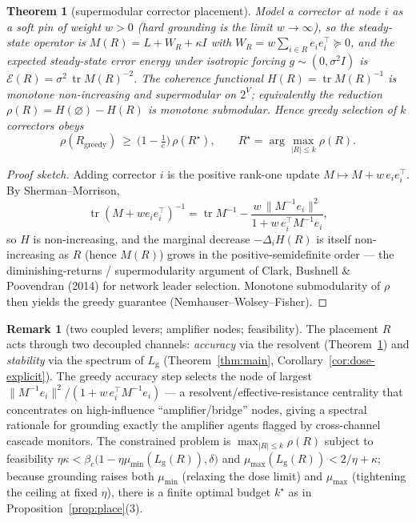 \documentclass[11pt]{article}
\newtheorem{theorem}{Theorem}
\theoremstyle{definition}
\newtheorem{remark}{Remark}
\newcommand{\Lg}{L_{\mathrm g}}
\begin{document}
\begin{theorem}[supermodular corrector placement]\label{thm:place}
Model a corrector at node $i$ as a soft pin of weight $w>0$ (hard grounding is the limit
$w\to\infty$), so the steady-state operator is $M(R)=L+W_R+\kappa I$ with
$W_R=w\sum_{i\in R}e_ie_i^\top\succeq0$, and the expected steady-state error energy under
isotropic forcing $g\sim(0,\sigma^2 I)$ is $\mathcal E(R)=\sigma^2\,\operatorname{tr}M(R)^{-2}$.
The coherence functional $H(R)=\operatorname{tr}M(R)^{-1}$ is monotone non-increasing and
\emph{supermodular} on $2^{V}$; equivalently the reduction $\rho(R)=H(\varnothing)-H(R)$ is
monotone \emph{submodular}. Hence greedy selection of $k$ correctors obeys
\[
  \rho(R_{\mathrm{greedy}})\ \ge\ \big(1-\tfrac1e\big)\,\rho(R^\star),
  \qquad R^\star=\arg\max_{|R|\le k}\rho(R).
\]
\end{theorem}
\begin{proof}[Proof sketch]
Adding corrector $i$ is the positive rank-one update $M\mapsto M+w\,e_ie_i^\top$. By
Sherman--Morrison,
\[
  \operatorname{tr}(M+w e_ie_i^\top)^{-1}
  =\operatorname{tr}M^{-1}-\frac{w\,\|M^{-1}e_i\|^2}{1+w\,e_i^\top M^{-1}e_i},
\]
so $H$ is non-increasing, and the marginal decrease $-\Delta_i H(R)$ is itself non-increasing as
$R$ (hence $M(R)$) grows in the positive-semidefinite order --- the diminishing-returns /
supermodularity argument of Clark, Bushnell \& Poovendran (2014) for network leader selection.
Monotone submodularity of $\rho$ then yields the greedy guarantee (Nemhauser--Wolsey--Fisher).
\end{proof}

\begin{remark}[two coupled levers; amplifier nodes; feasibility]
The placement $R$ acts through two decoupled channels: \emph{accuracy} via the resolvent
(Theorem~\ref{thm:place}) and \emph{stability} via the spectrum of $\Lg$
(Theorem~\ref{thm:main}, Corollary~\ref{cor:dose-explicit}). The greedy accuracy step selects the
node of largest $\|M^{-1}e_i\|^2/(1+w\,e_i^\top M^{-1}e_i)$ --- a resolvent/effective-resistance
centrality that concentrates on high-influence ``amplifier/bridge'' nodes, giving a spectral
rationale for grounding exactly the amplifier agents flagged by cross-channel cascade monitors.
The constrained problem is $\max_{|R|\le k}\rho(R)$ subject to feasibility
$\eta\kappa<\!\beta_c\!\big(1-\eta\mu_{\min}(\Lg(R)),\delta\big)$ and
$\mu_{\max}(\Lg(R))<2/\eta+\kappa$; because grounding raises both $\mu_{\min}$ (relaxing the dose
limit) and $\mu_{\max}$ (tightening the ceiling at fixed $\eta$), there is a finite optimal budget
$k^\star$ as in Proposition~\ref{prop:place}(3).
\end{remark}
\end{document}

